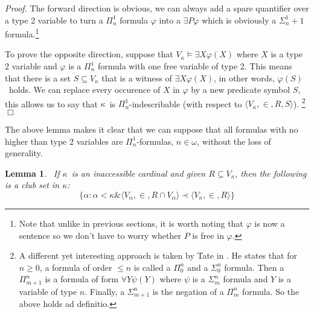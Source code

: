 \documentclass[12pt,a4paper]{article}
\newtheorem{lemma}[theorem]{Lemma}
\newenvironment{proof}
{\noindent \textit{Proof.}}
{\hspace*{\fill} $\Box$}
\newcommand{\et}{\mathrel{\&}}
\begin{document}
\begin{proof}
The forward direction is obvious, we can always add a spare quantifier over a type 2 variable to turn a $\Pi^1_n$ formula $\varphi$ into a $\exists P \varphi$ which is obviously a $\Sigma^1_n+1$ formula.\footnote{Note that unlike in previous sections, it is worth noting that $\varphi$ is now a sentence so we don't have to worry whether $P$ is free in $\varphi$.}

To prove the opposite direction, suppose that $V_\kappa \models \exists X \varphi(X)$ where $X$ is a type 2 variable and $\varphi$ is a $\Pi^1_n$ formula with one free variable of type 2. This means that there is a set $S \subseteq V_\kappa$ that is a witness of $\exists X \varphi(X)$, in other words, $\varphi(S)$ holds. We can replace every occurence of $X$ in $\varphi$ by a new predicate symbol $S$, this allows us to say that $\kappa$ is $\Pi^1_n$-indescribable (with respect to $\langle V_\kappa, \in, R, S \rangle$).
\footnote{A different yet interesting approach is taken by Tate in \cite{Tait_constructingcardinals}. He states that for $n\geq 0$, a formula of order $\leq n$ is called a $\Pi^n_0$ and a $\Sigma^n_0$ formula. Then a $\Pi^n_{m+1}$ is a formula of form $\forall Y \psi(Y)$ where $\psi$ is a $\Sigma^n_m$ formula and $Y$ is a variable of type $n$. Finally, a $\Sigma^n_{m+1}$ is the negation of a $\Pi^n_m$ formula. So the above holds ad definitio.}
\end{proof}

The above lemma makes it clear that we can suppose that all formulas with no higher than type 2 variables are $\Pi^1_n$-formulas, $n \in \omega$, without the loss of generality.

\begin{lemma}\label{lemma:inaccessible_clubset}\
If $\kappa$ is an inaccessible cardinal and given $R \subseteq V_\kappa$, then the following is a club set in $\kappa$:
\begin{equation}
\{\alpha : \alpha < \kappa \et \langle V_\alpha, \in, R \cap V_\alpha \rangle \prec \langle V_\kappa, \in, R \rangle \}\label{eq:inacc_lemma_set}
\end{equation}
\end{lemma}
\end{document}
